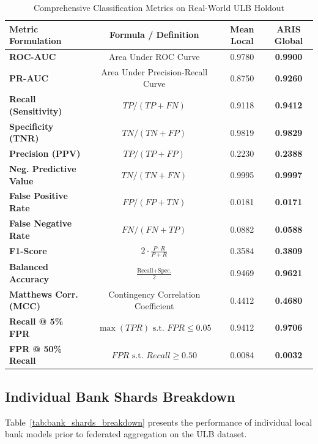 \documentclass[conference]{IEEEtran}
\begin{document}
\begin{table}[htbp]
\centering
\caption{Comprehensive Classification Metrics on Real-World ULB Holdout}
\label{tab:full_ml_metrics}
\small
\begin{tabular}{lccc}
\toprule
\textbf{Metric Formulation} & \textbf{Formula / Definition} & \textbf{Mean Local} & \textbf{ARIS Global} \\
\midrule
\textbf{ROC-AUC}                & Area Under ROC Curve                    & 0.9780 & \textbf{0.9900} \\
\textbf{PR-AUC}                 & Area Under Precision-Recall Curve       & 0.8750 & \textbf{0.9260} \\
\textbf{Recall (Sensitivity)}   & $TP / (TP + FN)$                        & 0.9118 & \textbf{0.9412} \\
\textbf{Specificity (TNR)}      & $TN / (TN + FP)$                        & 0.9819 & \textbf{0.9829} \\
\textbf{Precision (PPV)}        & $TP / (TP + FP)$                        & 0.2230 & \textbf{0.2388} \\
\textbf{Neg. Predictive Value}  & $TN / (TN + FN)$                        & 0.9995 & \textbf{0.9997} \\
\textbf{False Positive Rate}    & $FP / (FP + TN)$                        & 0.0181 & \textbf{0.0171} \\
\textbf{False Negative Rate}    & $FN / (FN + TP)$                        & 0.0882 & \textbf{0.0588} \\
\textbf{F1-Score}               & $2 \cdot \frac{P \cdot R}{P + R}$       & 0.3584 & \textbf{0.3809} \\
\textbf{Balanced Accuracy}      & $\frac{\text{Recall} + \text{Spec.}}{2}$& 0.9469 & \textbf{0.9621} \\
\textbf{Matthews Corr. (MCC)}   & Contingency Correlation Coefficient     & 0.4412 & \textbf{0.4680} \\
\textbf{Recall @ 5\% FPR}       & $\max(TPR) \text{ s.t. } FPR \le 0.05$  & 0.9412 & \textbf{0.9706} \\
\textbf{FPR @ 50\% Recall}      & $FPR \text{ s.t. } Recall \ge 0.50$     & 0.0084 & \textbf{0.0032} \\
\bottomrule
\end{tabular}
\end{table}

\subsection{Individual Bank Shards Breakdown}
Table~\ref{tab:bank_shards_breakdown} presents the performance of individual local bank models prior to federated aggregation on the ULB dataset.
\end{document}
